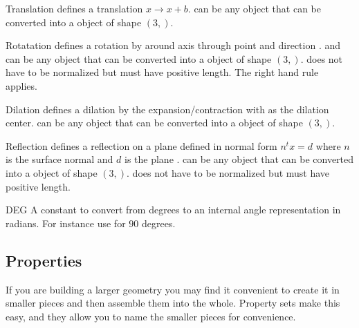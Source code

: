 \begin{classdesc}{Translation}{}
defines a translation $x \to x+b$.  can be any object that can be converted 
into a \numarray object of shape $(3,)$.
\end{classdesc}
              
\begin{classdesc}{Rotatation}{ }
defines a rotation by  around axis through point  and direction . 
 and  can be any object that can be converted 
into a \numarray object of shape $(3,)$.
 does not have to be normalized but must have positive length. The right hand rule~\cite{RIGHTHANDRULE}
applies.
\end{classdesc}


\begin{classdesc}{Dilation}{}
defines a dilation by the expansion/contraction  with 
 as the dilation center.
 can be any object that can be converted 
into a \numarray object of shape $(3,)$.
\end{classdesc}

\begin{classdesc}{Reflection}{}
defines a reflection on a plane defined in normal form $n^t x = d$ 
where $n$ is the surface normal  and $d$ is the plane .
 can be any object that can be converted 
into a \numarray object of shape $(3,)$.
 does not have to be normalized but must have positive length. 
\end{classdesc}

\begin{datadesc}{DEG}
A constant to convert from degrees to an internal angle representation in radians. For instance use  for $90$ degrees.
\end{datadesc}

\subsection{Properties}

If you are building a larger geometry you may find it convenient to
create it in smaller pieces and then assemble them into the whole. 
Property sets make this easy, and they allow you to name the smaller
pieces for convenience.

